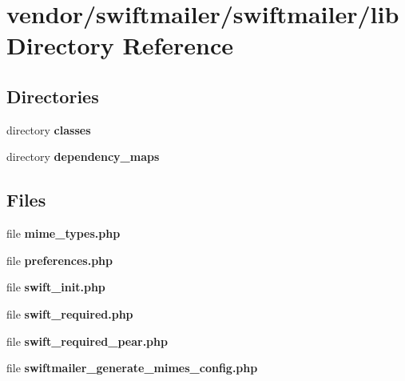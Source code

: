 \section{vendor/swiftmailer/swiftmailer/lib Directory Reference}
\label{dir_f6ccb0e3b8a87fe0f083056a5c321d4f}
\subsection*{Directories}
\begin{DoxyCompactItemize}
\item 
directory {\bf classes}
\item 
directory {\bf dependency\+\_\+maps}
\end{DoxyCompactItemize}
\subsection*{Files}
\begin{DoxyCompactItemize}
\item 
file {\bf mime\+\_\+types.\+php}
\item 
file {\bf preferences.\+php}
\item 
file {\bf swift\+\_\+init.\+php}
\item 
file {\bf swift\+\_\+required.\+php}
\item 
file {\bf swift\+\_\+required\+\_\+pear.\+php}
\item 
file {\bf swiftmailer\+\_\+generate\+\_\+mimes\+\_\+config.\+php}
\end{DoxyCompactItemize}
